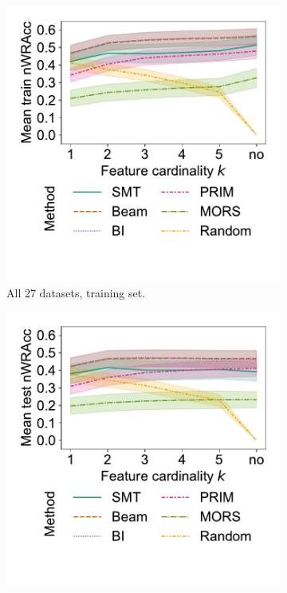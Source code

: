 \documentclass{article}
\theoremstyle{definition}
\begin{document}
\begin{figure}[t]
	\centering
	\begin{subfigure}[t]{0.48\textwidth}
		\centering
		\includegraphics[width=\textwidth, trim=15 55 15 15, clip]{plots/csd-cardinality-train-nwracc-all-datasets.pdf}
		\caption{All 27 datasets, training set.}
		\label{fig:csd:cardinality-train-nwracc-all-datasets}
	\end{subfigure}
	\hfill
	\begin{subfigure}[t]{0.48\textwidth}
		\centering
		\includegraphics[width=\textwidth, trim=15 55 15 15, clip]{plots/csd-cardinality-test-nwracc-all-datasets.pdf}

\end{subfigure}
\end{figure}
\end{document}
